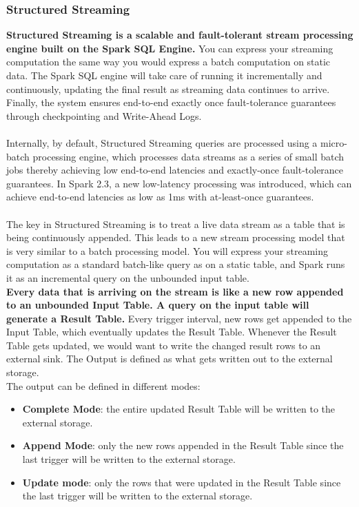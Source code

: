 \documentclass[10pt,a4paper]{article}
\newcommand{\nline}{\\~\\}
\begin{document}
\subsubsection{Structured Streaming}
\textbf{Structured Streaming is a scalable and fault-tolerant stream processing engine built on the Spark SQL Engine.} You can express your streaming computation the same way you would express a batch computation on static data. The Spark SQL engine will take care of running it incrementally and continuously, updating the final result as streaming data continues to arrive. Finally, the system ensures end-to-end exactly once fault-tolerance guarantees through checkpointing and Write-Ahead Logs.
\nline
Internally, by default, Structured Streaming queries are processed using a micro-batch processing engine, which processes data streams as a series of small batch jobs thereby achieving low end-to-end latencies and exactly-once fault-tolerance guarantees. In Spark 2.3, a new low-latency processing was introduced, which can achieve end-to-end latencies as low as 1ms with at-least-once guarantees.
\nline
The key in Structured Streaming is to treat a live data stream as a table that is being continuously appended. This leads to a new stream processing model that is very similar to a batch processing model. You will express your streaming computation as a standard batch-like query as on a static table, and Spark runs it as an incremental query on the unbounded input table. \\
\textbf{Every data that is arriving on the stream is like a new row appended to an unbounded Input Table. A query on the input table will generate a Result Table.} Every trigger interval, new rows get appended to the Input Table, which eventually updates the Result Table. Whenever the Result Table gets updated, we would want to write the changed result rows to an external sink. The Output is defined as what gets written out to the external storage. \\ 
The output can be defined in different modes:
\begin{itemize}
	\item \textbf{Complete Mode}: the entire updated Result Table will be written to the external storage. 
	\item \textbf{Append Mode}: only the new rows appended in the Result Table since the last trigger will be written to the external storage.
	\item \textbf{Update mode}: only the rows that were updated in the Result Table since the last trigger will be written to the external storage.
\end{itemize}
\end{document}
